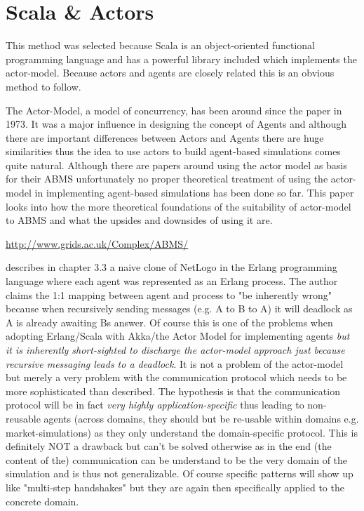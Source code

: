 
\chapter{Scala \& Actors} 
This method was selected because Scala is an object-oriented functional programming language and has a powerful library included which implements the actor-model. Because actors and agents are closely related this is an obvious method to follow.


The Actor-Model, a model of concurrency, has been around since the paper \cite{Hewitt_1973} in 1973. It was a major influence in designing the concept of Agents and although there are important differences between Actors and Agents there are huge similarities thus the idea to use actors to build agent-based simulations comes quite natural. Although there are papers around using the actor model as basis for their ABMS unfortunately no proper theoretical treatment of using the actor-model in implementing agent-based simulations has been done so far. This paper looks into how the more theoretical foundations of the suitability of actor-model to ABMS and what the upsides and downsides of using it are.

\url{http://www.grids.ac.uk/Complex/ABMS/}

\cite{Bezirgiannis2013} describes in chapter 3.3 a naive clone of NetLogo in the Erlang programming language where each agent was represented as an Erlang process. The author claims the 1:1 mapping between agent and process to "be inherently wrong" because when recursively sending messages (e.g. A to B to A) it will deadlock as A is already awaiting Bs answer. Of course this is one of the problems when adopting Erlang/Scala with Akka/the Actor Model for implementing agents \textit{but it is inherently short-sighted to discharge the actor-model approach just because recursive messaging leads to a deadlock}. It is not a problem of the actor-model but merely a very problem with the communication protocol which needs to be more sophisticated than \cite{Bezirgiannis2013} described. The hypothesis is that the communication protocol will be in fact \textit{very highly application-specific} thus leading to non-reusable agents (across domains, they should but be re-usable within domains e.g. market-simulations) as they only understand the domain-specific protocol. This is definitely NOT a drawback but can't be solved otherwise as in the end (the content of the) communication can be understand to be the very domain of the simulation and is thus not generalizable. Of course specific patterns will show up like "multi-step handshakes" but they are again then specifically applied to the concrete domain.

